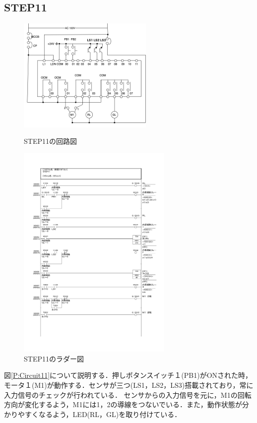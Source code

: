 \documentclass[a4paper,11pt]{jsarticle}
\begin{document}
\subsection{STEP11}
\begin{figure}[H]
  \begin{minipage}{0.38\textwidth}
    \begin{center}
      \includegraphics[clip,width=6.5cm]{picture/Circuit11.png}
    \end{center}
    \caption{STEP11の回路図}
    \label{P:Circuit11}
  \end{minipage}
  \begin{minipage}{0.58\textwidth}
    \begin{center}
      \includegraphics[clip,width=7.5cm]{picture/STEP11.pdf}
    \end{center}
    \caption{STEP11のラダー図}
    \label{C:Step11}
  \end{minipage}
\end{figure}
図\ref{P:Circuit11}について説明する．押しボタンスイッチ１(PB1)がONされた時，モータ１(M1)が動作する．センサが三つ(LS1，LS2，LS3)搭載されており，常に入力信号のチェックが行われている．
センサからの入力信号を元に，M1の回転方向が変化するよう，M1には1，2の導線をつないでいる．また，動作状態が分かりやすくなるよう，LED(RL，GL)を取り付けている． \par
\end{document}
